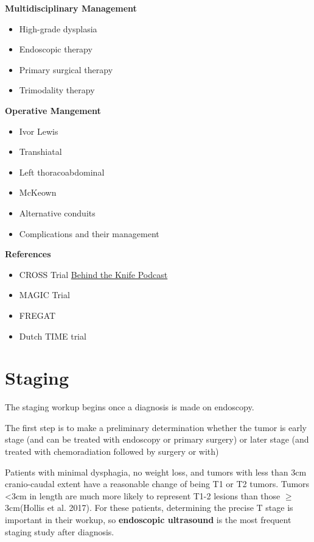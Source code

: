 \documentclass[
  letterpaper,
]{scrbook}
\providecommand{\tightlist}{%
  \setlength{\itemsep}{0pt}\setlength{\parskip}{0pt}}
\begin{document}
\textbf{Multidisciplinary Management}

\begin{itemize}
\tightlist
\item
  High-grade dysplasia
\item
  Endoscopic therapy
\item
  Primary surgical therapy
\item
  Trimodality therapy
\end{itemize}

\textbf{Operative Mangement}

\begin{itemize}
\tightlist
\item
  Ivor Lewis
\item
  Transhiatal
\item
  Left thoracoabdominal
\item
  McKeown
\item
  Alternative conduits
\item
  Complications and their management
\end{itemize}

\textbf{References}

\begin{itemize}
\tightlist
\item
  CROSS Trial \href{https://www.youtube.com/watch?v=4XWNr4rJXQ}{Behind
  the Knife Podcast}
\item
  MAGIC Trial
\item
  FREGAT
\item
  Dutch TIME trial
\end{itemize}

\chapter{Staging}\label{staging}

The staging workup begins once a diagnosis is made on endoscopy.

The first step is to make a preliminary determination whether the tumor
is early stage (and can be treated with endoscopy or primary surgery) or
later stage (and treated with chemoradiation followed by surgery or
with)

Patients with minimal dysphagia, no weight loss, and tumors with less
than 3cm cranio-caudal extent have a reasonable change of being T1 or T2
tumors. Tumors \textless3cm in length are much more likely to represent
T1-2 lesions than those \(\geq\) 3cm(Hollis et al. 2017). For these
patients, determining the precise T stage is important in their workup,
so \textbf{endoscopic ultrasound} is the most frequent staging study
after diagnosis.
\end{document}

